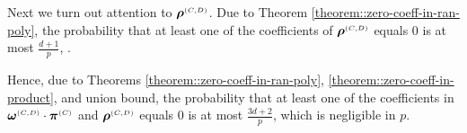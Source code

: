 Next we turn out attention to $\bm\rho^{\scriptscriptstyle (C,D)}$. Due to Theorem \ref{theorem::zero-coeff-in-ran-poly}, the probability that at least one of the coefficients of $\bm\rho^{\scriptscriptstyle (C,D)}$ equals $0$ is at most $\frac{d+1}{p}$, . 

%
%

Hence, due to Theorems \ref{theorem::zero-coeff-in-ran-poly}, \ref{theorem::zero-coeff-in-product}, and union bound, the probability that at least one of the coefficients in $\bm\omega^{\scriptscriptstyle (C,D)}\cdot \bm\pi^{\scriptscriptstyle  {  {(C)}}}$ and  $\bm\rho^{\scriptscriptstyle (C,D)}$ equals $0$ is at most $\frac{3d+2}{p}$, which is negligible in  $p$. 















